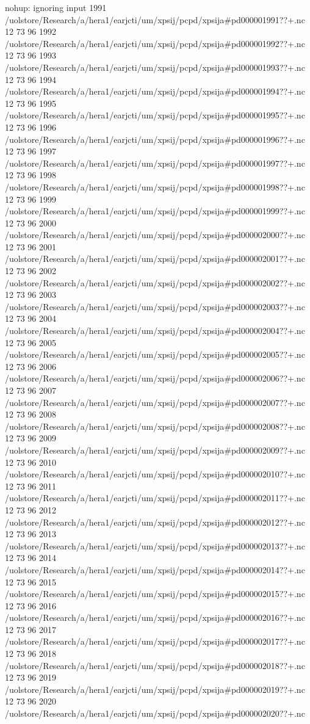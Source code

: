 nohup: ignoring input
1991
/uolstore/Research/a/hera1/earjcti/um/xpsij/pcpd/xpsija#pd000001991??+.nc
12 73 96
1992
/uolstore/Research/a/hera1/earjcti/um/xpsij/pcpd/xpsija#pd000001992??+.nc
12 73 96
1993
/uolstore/Research/a/hera1/earjcti/um/xpsij/pcpd/xpsija#pd000001993??+.nc
12 73 96
1994
/uolstore/Research/a/hera1/earjcti/um/xpsij/pcpd/xpsija#pd000001994??+.nc
12 73 96
1995
/uolstore/Research/a/hera1/earjcti/um/xpsij/pcpd/xpsija#pd000001995??+.nc
12 73 96
1996
/uolstore/Research/a/hera1/earjcti/um/xpsij/pcpd/xpsija#pd000001996??+.nc
12 73 96
1997
/uolstore/Research/a/hera1/earjcti/um/xpsij/pcpd/xpsija#pd000001997??+.nc
12 73 96
1998
/uolstore/Research/a/hera1/earjcti/um/xpsij/pcpd/xpsija#pd000001998??+.nc
12 73 96
1999
/uolstore/Research/a/hera1/earjcti/um/xpsij/pcpd/xpsija#pd000001999??+.nc
12 73 96
2000
/uolstore/Research/a/hera1/earjcti/um/xpsij/pcpd/xpsija#pd000002000??+.nc
12 73 96
2001
/uolstore/Research/a/hera1/earjcti/um/xpsij/pcpd/xpsija#pd000002001??+.nc
12 73 96
2002
/uolstore/Research/a/hera1/earjcti/um/xpsij/pcpd/xpsija#pd000002002??+.nc
12 73 96
2003
/uolstore/Research/a/hera1/earjcti/um/xpsij/pcpd/xpsija#pd000002003??+.nc
12 73 96
2004
/uolstore/Research/a/hera1/earjcti/um/xpsij/pcpd/xpsija#pd000002004??+.nc
12 73 96
2005
/uolstore/Research/a/hera1/earjcti/um/xpsij/pcpd/xpsija#pd000002005??+.nc
12 73 96
2006
/uolstore/Research/a/hera1/earjcti/um/xpsij/pcpd/xpsija#pd000002006??+.nc
12 73 96
2007
/uolstore/Research/a/hera1/earjcti/um/xpsij/pcpd/xpsija#pd000002007??+.nc
12 73 96
2008
/uolstore/Research/a/hera1/earjcti/um/xpsij/pcpd/xpsija#pd000002008??+.nc
12 73 96
2009
/uolstore/Research/a/hera1/earjcti/um/xpsij/pcpd/xpsija#pd000002009??+.nc
12 73 96
2010
/uolstore/Research/a/hera1/earjcti/um/xpsij/pcpd/xpsija#pd000002010??+.nc
12 73 96
2011
/uolstore/Research/a/hera1/earjcti/um/xpsij/pcpd/xpsija#pd000002011??+.nc
12 73 96
2012
/uolstore/Research/a/hera1/earjcti/um/xpsij/pcpd/xpsija#pd000002012??+.nc
12 73 96
2013
/uolstore/Research/a/hera1/earjcti/um/xpsij/pcpd/xpsija#pd000002013??+.nc
12 73 96
2014
/uolstore/Research/a/hera1/earjcti/um/xpsij/pcpd/xpsija#pd000002014??+.nc
12 73 96
2015
/uolstore/Research/a/hera1/earjcti/um/xpsij/pcpd/xpsija#pd000002015??+.nc
12 73 96
2016
/uolstore/Research/a/hera1/earjcti/um/xpsij/pcpd/xpsija#pd000002016??+.nc
12 73 96
2017
/uolstore/Research/a/hera1/earjcti/um/xpsij/pcpd/xpsija#pd000002017??+.nc
12 73 96
2018
/uolstore/Research/a/hera1/earjcti/um/xpsij/pcpd/xpsija#pd000002018??+.nc
12 73 96
2019
/uolstore/Research/a/hera1/earjcti/um/xpsij/pcpd/xpsija#pd000002019??+.nc
12 73 96
2020
/uolstore/Research/a/hera1/earjcti/um/xpsij/pcpd/xpsija#pd000002020??+.nc

